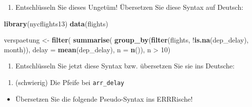 \documentclass[12pt,ngerman,]{book}
\newenvironment{Shaded}{\begin{snugshade}}{\end{snugshade}}
\newcommand{\KeywordTok}[1]{\textcolor[rgb]{0.13,0.29,0.53}{\textbf{{#1}}}}
\newcommand{\DataTypeTok}[1]{\textcolor[rgb]{0.13,0.29,0.53}{{#1}}}
\newcommand{\DecValTok}[1]{\textcolor[rgb]{0.00,0.00,0.81}{{#1}}}
\newcommand{\StringTok}[1]{\textcolor[rgb]{0.31,0.60,0.02}{{#1}}}
\newcommand{\NormalTok}[1]{{#1}}
\providecommand{\tightlist}{%
  \setlength{\itemsep}{0pt}\setlength{\parskip}{0pt}}
\renewenvironment{Shaded}{\begin{kframe}}{\end{kframe}}
\begin{document}
\begin{enumerate}
\def\labelenumi{\arabic{enumi}.}
\tightlist
\item
  Entschlüsseln Sie dieses Ungetüm! Übersetzen Sie diese Syntax auf
  Deutsch:
\end{enumerate}

\begin{Shaded}
\begin{Highlighting}[]

\KeywordTok{library}\NormalTok{(nycflights13)}
\KeywordTok{data}\NormalTok{(flights)}

\NormalTok{verspaetung <-}
\StringTok{  }\KeywordTok{filter}\NormalTok{(}
    \KeywordTok{summarise}\NormalTok{(}
    \KeywordTok{group_by}\NormalTok{(}\KeywordTok{filter}\NormalTok{(flights, !}\KeywordTok{is.na}\NormalTok{(dep_delay), month)), }\DataTypeTok{delay =} \KeywordTok{mean}\NormalTok{(dep_delay), }\DataTypeTok{n =} \KeywordTok{n}\NormalTok{()), n >}\StringTok{ }\DecValTok{10}\NormalTok{)}
 
\end{Highlighting}
\end{Shaded}

\begin{enumerate}
\def\labelenumi{\arabic{enumi}.}
\setcounter{enumi}{1}
\tightlist
\item
  Entschlüsseln Sie jetzt diese Syntax bzw. übersetzen Sie sie ins
  Deutsche:
\end{enumerate}

\begin{Shaded}
\end{Shaded}

\begin{enumerate}
\def\labelenumi{\arabic{enumi}.}
\setcounter{enumi}{2}
\tightlist
\item
  (schwierig) Die Pfeife bei \texttt{arr\_delay}
\end{enumerate}

\begin{itemize}
\tightlist
\item
  Übersetzen Sie die folgende Pseudo-Syntax ins ERRRische!
\end{itemize}
\end{document}
